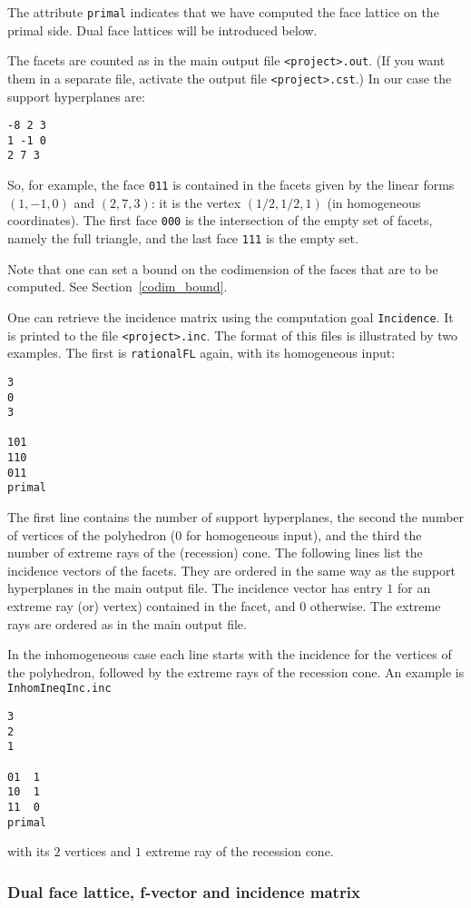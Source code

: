 \documentclass[12pt,a4paper]{scrartcl}
\theoremstyle{definition}
\begin{document}
The attribute \verb|primal| indicates that we have computed the face lattice on the primal side. Dual face lattices will be introduced below.

The facets are counted as in the main output file \verb|<project>.out|. (If you want them in a separate file, activate the output file \verb|<project>.cst|.) In our case the support hyperplanes are:
\begin{Verbatim}
-8 2 3 
1 -1 0 
2 7 3
\end{Verbatim}
So, for example, the face \verb|011| is contained in the facets given by the linear forms $(1,-1,0)$ and
$(2,7,3)$: it is the vertex $(1/2,1/2,1)$ (in homogeneous coordinates). The first face \verb|000| is the intersection of the empty set of facets, namely the full triangle, and the last face \verb|111| is the empty set.

Note that one can set a bound on the codimension of the faces that are to be computed. See Section~\ref{codim_bound}.

One can retrieve the incidence matrix using the computation goal \verb|Incidence|. It is printed to the file \verb|<project>.inc|. The format of this files is illustrated by two examples. The first is \verb|rationalFL| again, with its homogeneous input:
\begin{Verbatim}
3
0
3

101
110
011
primal
\end{Verbatim}
The first line contains the number of support hyperplanes, the second the number of vertices of the polyhedron ($0$ for homogeneous input), and the third the number of extreme rays of the (recession) cone. The following lines list the incidence vectors of the facets. They are ordered in the same way as the support hyperplanes in the main output file. The incidence vector has entry $1$ for an extreme ray (or) vertex) contained in the facet, and $0$ otherwise. The extreme rays are ordered as in the main output file.

In the inhomogeneous case each line starts with the incidence for the vertices of the polyhedron, followed by the extreme rays of the recession cone. An example is \verb|InhomIneqInc.inc|
\begin{Verbatim}
3
2
1

01  1
10  1
11  0
primal
\end{Verbatim}
with its $2$ vertices and $1$ extreme ray of the recession cone.

\subsubsection{Dual face lattice, f-vector and incidence matrix}
\end{document}
